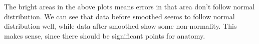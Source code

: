 The bright areas in the above plots means errors in that area don't follow
normal distribution. We can see that data before smoothed seems to follow
normal distribution well, while data after smoothed show some non-normality.
This makes sense, since there should be significant points for anatomy.






